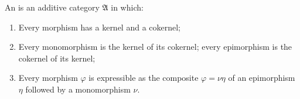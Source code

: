An  is an additive category $\mathfrak{A}$ in which:
\begin{enumerate}
\item[(i)] Every morphism has a kernel and a cokernel;
\item[(ii)] Every monomorphism is the kernel of its cokernel; every epimorphism is the cokernel of its kernel;
\item[(iii)] Every morphism $\varphi$ is expressible as the composite $\varphi = \nu \eta$ of an epimorphism $\eta$ followed by a monomorphism $\nu$.
\end{enumerate}
